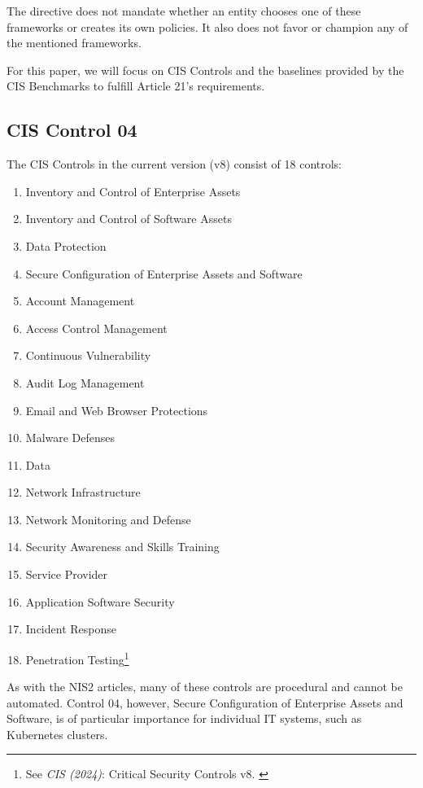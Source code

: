 The directive does not mandate whether an entity chooses one of these frameworks or creates its own policies. It also does not favor or champion any of the mentioned frameworks.

For this paper, we will focus on CIS Controls and the baselines provided by the CIS Benchmarks to fulfill Article 21's requirements.

\subsection{CIS Control 04}

The CIS Controls in the current version (v8) consist of 18 controls:

\begin{enumerate}
    \item Inventory and Control of Enterprise Assets
    \item Inventory and Control of Software Assets
    \item Data Protection
    \item Secure Configuration of Enterprise Assets and Software
    \item Account Management
    \item Access Control Management
    \item Continuous Vulnerability
    \item Audit Log Management
    \item Email and Web Browser Protections
    \item Malware Defenses
    \item Data
    \item Network Infrastructure
    \item Network Monitoring and Defense
    \item Security Awareness and Skills Training
    \item Service Provider
    \item Application Software Security
    \item Incident Response
    \item Penetration Testing\footnote{See \textit{CIS (2024)}: Critical Security Controls v8. \cite{cisControls}}
\end{enumerate}

As with the NIS2 articles, many of these controls are procedural and cannot be automated. Control 04, however, Secure Configuration of Enterprise Assets and Software, is of particular importance for individual IT systems, such as Kubernetes clusters.

